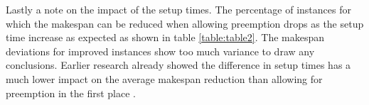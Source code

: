Lastly a note on the impact of the setup times. The percentage of instances for which the makespan can be reduced when allowing preemption drops as the setup time increase as expected as shown in table \ref{table:table2}. The makespan deviations for improved instances show too much variance to draw any conclusions. Earlier research already showed the difference in setup times has a much lower impact on the average makespan reduction than allowing for preemption in the first place \cite{RN1}.